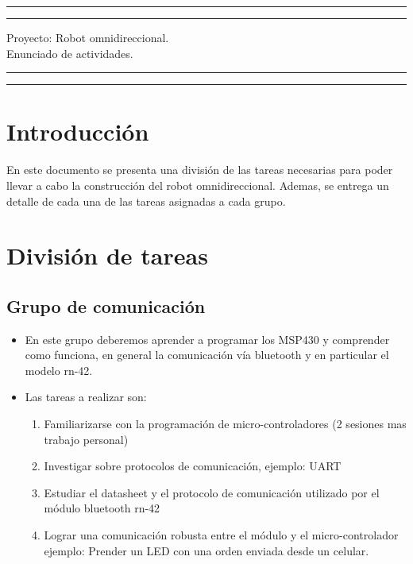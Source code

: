 \documentclass[11pt,letterpaper,spanish]{article}
\begin{document}

\begin{center} %
\end{center}
\bigskip
 
\begin{center}
\hrule
\vspace{0.1 cm}
\hrule
\vspace{0.5 cm}
\huge{Proyecto: Robot omnidireccional.}\\
\Large{Enunciado de actividades.}\\
\vspace{0.5 cm}
\hrule
\vspace{0.1 cm}
\hrule
\end{center}
\vspace{0.2 cm}
\section{Introducción}
\par 
En este documento se presenta una división de las tareas necesarias para poder llevar a cabo la construcción del robot omnidireccional. Ademas, se entrega un detalle de cada una de las tareas asignadas a cada grupo.
\section{División de tareas}
\subsection{Grupo de comunicación}
\begin{itemize}
\item En este grupo deberemos aprender a programar los MSP430 y comprender como funciona, en general la comunicación vía bluetooth y en particular el modelo rn-42.
\item  Las tareas a realizar son:

\begin{enumerate}
\item Familiarizarse con la programación de micro-controladores (2 sesiones mas trabajo personal)
\item  Investigar sobre protocolos de comunicación, ejemplo: UART
\item Estudiar el datasheet y el protocolo de comunicación utilizado por el módulo bluetooth  rn-42
\item Lograr una comunicación robusta entre el módulo y el micro-controlador ejemplo: Prender un LED con una orden enviada desde un celular.
\end{enumerate} 
\end{itemize}
\end{document}
